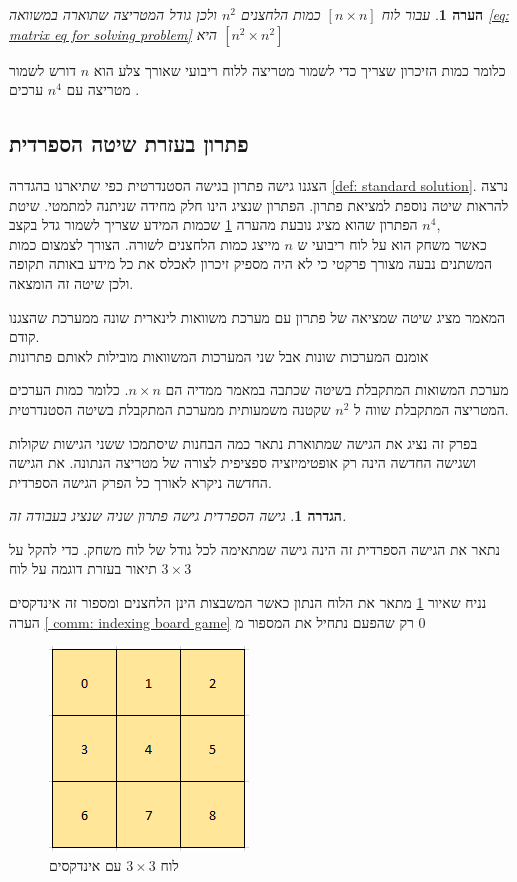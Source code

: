 \documentclass[12pt,leqno]{article}
\newtheorem{definition}{הגדרה}[section]
\newtheorem{comm}{הערה}[section]
\begin{document}
\begin{comm}
    \label{comm: for board too many variables}
    עבור לוח 
$[n \times n]$
כמות הלחצנים 
$n^2$
ולכן גודל המטריצה שתוארה במשוואה
\ref{eq: matrix eq for solving problem}
היא 
$[n^2 \times n^2]$
\end{comm}

כלומר כמות הזיכרון שצריך כדי לשמור מטריצה ללוח ריבועי שאורך צלע הוא
$n$
דורש לשמור מטריצה עם 
$n^4$
ערכים
.

\subsection{פתרון בעזרת שיטה הספרדית}
הצגנו גישה פתרון
בגישה הסטנדרטית 
כפי שתיארנו
בהגדרה
\ref{def: standard solution}.
נרצה להראות שיטה נוספת למציאת פתרון.
הפתרון שנציג הינו חלק מחידה שניתנה למתמטי.
שיטת הפתרון שהוא מציג נובעת מהערה 
\ref{comm: for board too many variables}
שכמות המידע שצריך לשמור גדל בקצב 
$n^4$,
\\
כאשר
משחק הוא על לוח ריבועי ש
$n$
מייצג
כמות הלחצנים לשורה.
הצורך לצמצום כמות המשתנים נבעה מצורך פרקטי כי לא היה מספיק זיכרון לאכלס את כל מידע 
באותה תקופה ולכן שיטה זה הומצאה.

המאמר 
\cite{B1}
מציג שיטה שמציאה של פתרון עם מערכת משוואות לינארית שונה ממערכת שהצגנו קודם.
\\
אומנם המערכות שונות אבל שני המערכות המשוואות מובילות לאותם פתרונות

מערכת המשואות המתקבלת בשיטה שכתבה במאמר 
\cite{B1}
ממדיה הם
$n \times n $.
כלומר כמות הערכים המטריצה המתקבלת שווה
ל
$n^2$
שקטנה משמעותית 
ממערכת המתקבלת בשיטה הסטנדרטית.

בפרק זה נציג את הגישה שמתוארת 
\cite{B1}
נתאר כמה הבחנות שיסתמכו ששני הגישות שקולות ושגישה החדשה הינה רק אופטימיזציה
ספציפית לצורה של מטריצה הנתונה.
את הגישה החדשה ניקרא לאורך כל הפרק הגישה הספרדית.

\begin{definition}
    \label{def: spanish way}
    גישה הספרדית גישה פתרון שניה שנציג בעבודה זה.
\end{definition}

נתאר את הגישה הספרדית 
זה הינה גישה שמתאימה לכל גודל של לוח משחק.
כדי להקל על תיאור 
בעזרת דוגמה על לוח 
$3 \times 3$

נניח שאיור 
\ref{fig: 3 x 3 board indexed}
מתאר את הלוח הנתון כאשר המשבצות הינן הלחצנים ומספור זה אינדקסים הערה 
\ref{ comm: indexing board game}
רק שהפעם נתחיל את המספור מ
$0$

\begin{figure}[ht]
    \caption{לוח 
    $3 \times 3$
    עם אינדקסים}
    \label{fig: 3 x 3 board indexed}
    \centering
    \includegraphics[width=.3\textwidth,height=.3\textheight,keepaspectratio]{images/3x3_board_index.PNG}
\end{figure}
\end{document}
